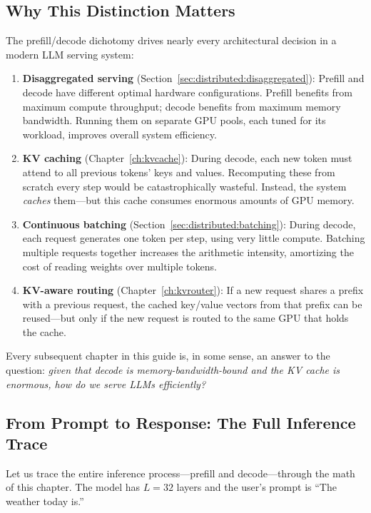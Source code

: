 \subsection{Why This Distinction Matters}
\label{sec:why-prefill-decode}

The prefill/decode dichotomy drives nearly every architectural decision in a modern LLM serving system:
\begin{enumerate}
    \item \textbf{Disaggregated serving} (Section~\ref{sec:distributed:disaggregated}): Prefill and decode have different optimal hardware configurations. Prefill benefits from maximum compute throughput; decode benefits from maximum memory bandwidth. Running them on separate GPU pools, each tuned for its workload, improves overall system efficiency.
    \item \textbf{KV caching} (Chapter~\ref{ch:kvcache}): During decode, each new token must attend to all previous tokens' keys and values. Recomputing these from scratch every step would be catastrophically wasteful. Instead, the system \emph{caches} them---but this cache consumes enormous amounts of GPU memory.
    \item \textbf{Continuous batching} (Section~\ref{sec:distributed:batching}): During decode, each request generates one token per step, using very little compute. Batching multiple requests together increases the arithmetic intensity, amortizing the cost of reading weights over multiple tokens.
    \item \textbf{KV-aware routing} (Chapter~\ref{ch:kvrouter}): If a new request shares a prefix with a previous request, the cached key/value vectors from that prefix can be reused---but only if the new request is routed to the same GPU that holds the cache.
\end{enumerate}

Every subsequent chapter in this guide is, in some sense, an answer to the question: \emph{given that decode is memory-bandwidth-bound and the KV cache is enormous, how do we serve LLMs efficiently?}

\subsection{From Prompt to Response: The Full Inference Trace}
\label{sec:inference-trace}

Let us trace the entire inference process---prefill and decode---through the math of this chapter. The model has $L = 32$ layers and the user's prompt is ``The weather today is.''

